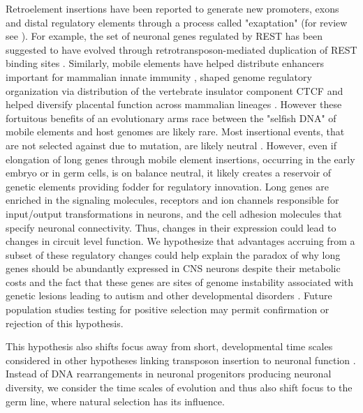 Retroelement insertions have been reported to generate new promoters, exons and distal regulatory elements through a process called "exaptation" (for review see \cite{Chuong_2016}). For example, the set of neuronal genes regulated by REST has been suggested to have evolved through retrotransposon-mediated duplication of REST binding sites \citep{Johnson_2006}. Similarly, mobile elements have helped distribute enhancers important for mammalian innate immunity \cite{Chuong_2016a}, shaped genome regulatory organization via distribution of the vertebrate insulator component CTCF \citep{Schmidt_2012} and helped diversify placental function across mammalian lineages \citep{Chuong_2013}. However these fortuitous benefits of an evolutionary arms race between the "selfish DNA" of mobile elements and host genomes are likely rare. Most insertional events, that are not selected against due to mutation, are likely neutral \cite{Zhang_2011}. However, even if elongation of long genes through mobile element insertions, occurring in the early embryo or in germ cells, is on balance neutral, it likely creates a reservoir of genetic elements providing fodder for regulatory innovation. Long genes are enriched in the signaling molecules, receptors and ion channels responsible for input/output transformations in neurons, and the cell adhesion molecules that specify neuronal connectivity. Thus, changes in their expression could lead to changes in circuit level function. We hypothesize that advantages accruing from a subset of these regulatory changes could help explain the paradox of why long genes should be abundantly expressed in CNS neurons despite their metabolic costs and the fact that these genes are sites of genome instability associated with genetic lesions leading to autism and other developmental disorders \citep{Wei_2016}. Future population studies testing for positive selection may permit confirmation or rejection of this hypothesis.   


This hypothesis also shifts focus away from short, developmental time scales considered in other hypotheses linking transposon insertion to neuronal function \citep{Muotri_2005,Richardson_2014,Perrat_2013}. Instead of DNA rearrangements in neuronal progenitors producing neuronal diversity, we consider the time scales of evolution and thus also shift focus to the germ line, where natural selection has its influence. 



